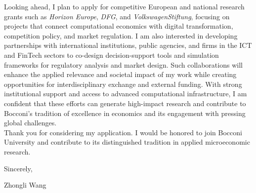 \documentclass{nfr}
\begin{document}
Looking ahead, I plan to apply for competitive European and national research grants such as \textit{Horizon Europe}, \textit{DFG}, and \textit{VolkswagenStiftung}, focusing on projects that connect computational economics with digital transformation, competition policy, and market regulation. 
I am also interested in developing partnerships with international institutions, public agencies, and firms in the ICT and FinTech sectors to co-design decision-support tools and simulation frameworks for regulatory analysis and market design. 
Such collaborations will enhance the applied relevance and societal impact of my work while creating opportunities for interdisciplinary exchange and external funding. 
With strong institutional support and access to advanced computational infrastructure, I am confident that these efforts can generate high-impact research and contribute to Bocconi’s tradition of excellence in economics and its engagement with pressing global challenges.\\

Thank you for considering my application. 
I would be honored to join Bocconi University and contribute to its distinguished tradition in applied microeconomic research.\\
\vspace{3mm}

\noindent Sincerely,\\
\vspace{3mm}

\noindent Zhongli Wang

\vspace{10mm}


\end{document}
